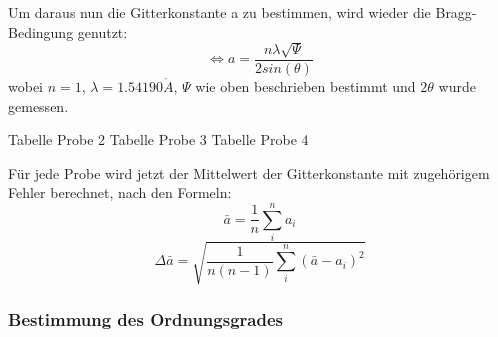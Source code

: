             Um daraus nun die Gitterkonstante a zu bestimmen, wird wieder die Bragg-Bedingung genutzt:
            \begin{equation}
                \Leftrightarrow a = \frac{n \lambda \sqrt{\Psi}}{2 sin(\theta)}
            \end{equation}
            wobei $n=1$, $\lambda = 1.54190 \mathring{A}$, $\Psi$ wie oben beschrieben bestimmt und $2 \theta$ wurde gemessen.

            Tabelle Probe 2
            Tabelle Probe 3
            Tabelle Probe 4

            Für jede Probe wird jetzt der Mittelwert der Gitterkonstante mit zugehörigem
            Fehler berechnet, nach den Formeln:
            \begin{equation}
                \bar{a} = \frac{1}{n} \sum^n_i a_i
            \end{equation}
            \begin{equation}
                \Delta \bar{a} = \sqrt{\frac{1}{n(n-1)} \sum^n_i (\bar{a}-a_i)^2}
            \end{equation}  

            \subsubsection{Bestimmung des Ordnungsgrades}

  
